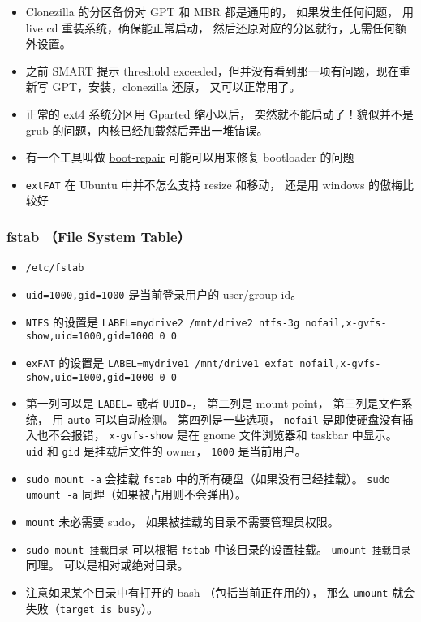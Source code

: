 \begin{itemize}
\item Clonezilla 的分区备份对 GPT 和 MBR 都是通用的， 如果发生任何问题， 用 live cd 重装系统，确保能正常启动， 然后还原对应的分区就行，无需任何额外设置。
\item 之前 SMART 提示 threshold exceeded，但并没有看到那一项有问题，现在重新写 GPT，安装，clonezilla 还原， 又可以正常用了。
\item  正常的 ext4 系统分区用 Gparted 缩小以后， 突然就不能启动了！貌似并不是 grub 的问题，内核已经加载然后弄出一堆错误。
\item 有一个工具叫做 \href{https://help.ubuntu.com/community/Boot-Repair}{boot-repair} 可能可以用来修复 bootloader 的问题
\item \verb|extFAT| 在 Ubuntu 中并不怎么支持 resize 和移动， 还是用 windows 的傲梅比较好
\end{itemize}

\subsubsection{fstab （File System Table）}
\begin{itemize}
\item \verb|/etc/fstab|
\item \verb|uid=1000,gid=1000| 是当前登录用户的 user/group id。
\item \verb|NTFS| 的设置是 \verb|LABEL=mydrive2 /mnt/drive2 ntfs-3g nofail,x-gvfs-show,uid=1000,gid=1000 0 0|
\item \verb|exFAT| 的设置是 \verb|LABEL=mydrive1 /mnt/drive1 exfat nofail,x-gvfs-show,uid=1000,gid=1000 0 0|
\item 第一列可以是 \verb|LABEL=| 或者 \verb|UUID=|， 第二列是 mount point， 第三列是文件系统， 用 \verb|auto| 可以自动检测。 第四列是一些选项， \verb|nofail| 是即使硬盘没有插入也不会报错， \verb|x-gvfs-show| 是在 gnome 文件浏览器和 taskbar 中显示。 \verb|uid| 和 \verb|gid| 是挂载后文件的 owner， \verb|1000| 是当前用户。
\item \verb|sudo mount -a| 会挂载 \verb|fstab| 中的所有硬盘（如果没有已经挂载）。 \verb|sudo umount -a| 同理（如果被占用则不会弹出）。
\item \verb|mount| 未必需要 sudo， 如果被挂载的目录不需要管理员权限。
\item \verb|sudo mount 挂载目录| 可以根据 \verb|fstab| 中该目录的设置挂载。 \verb|umount 挂载目录| 同理。 可以是相对或绝对目录。
\item 注意如果某个目录中有打开的 bash （包括当前正在用的）， 那么 \verb|umount| 就会失败（\verb|target is busy|）。
\end{itemize}

